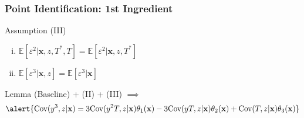 \documentclass{beamer}
\begin{document}
\begin{frame}
  \frametitle{Point Identification: 1st Ingredient}

  \begin{block}{Assumption (III)}
    \begin{enumerate}[(i)]
    \item $\mathbb{E}[\varepsilon^2|\mathbf{x},z,T^*,T] = \mathbb{E}[\varepsilon^2|\mathbf{x},z, T^*]$
    \item $\mathbb{E}[\varepsilon^3|\mathbf{x},z] = \mathbb{E}[\varepsilon^3|\mathbf{x}]$
  \end{enumerate}
  \end{block}
 
  \begin{block}{Lemma}
    (Baseline) + (II) + (III) $\implies$ 
  \small
\[
  \alert{\mbox{Cov}(y^3,z|\mathbf{x}) = 3 \mbox{Cov}(y^2T,z|\mathbf{x}) \theta_1(\mathbf{x}) -3\mbox{Cov}(yT,z|\mathbf{x}) \theta_2(\mathbf{x}) + \mbox{Cov}(T,z|\mathbf{x}) \theta_3(\mathbf{x})}
\]
\end{block}
\end{frame}
\end{document}
